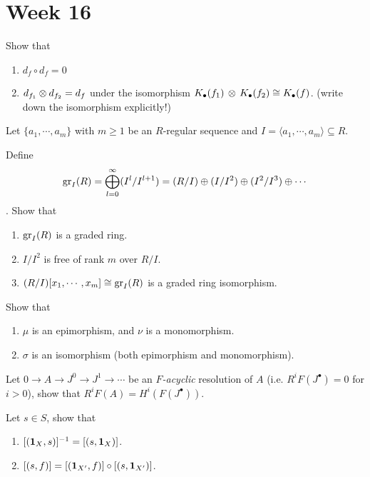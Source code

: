 
\section{Week 16}

\begin{exercise} Show that
  \begin{enumerate}
    \item $d_f \circ d_f = 0$
    \item $d_{f_1} \otimes d_{f_2} = d_f$ under the isomorphism 
      $K_\bullet (f_1) \, \otimes\, K_\bullet(f_2) \cong K_\bullet(f)$.
      (write down the isomorphism explicitly!)
  \end{enumerate}
\end{exercise}

\begin{exercise}
  Let $\{ a_1, \cdots, a_m \}$ with $m \ge 1$ be an $R$-regular sequence
  and $I = \langle a_1, \cdots, a_m \rangle \subseteq R$.

  Define 
  $$\operatorname{gr}_I(R) = \bigoplus\limits_{l=0}^\infty (I^l / I^{l+1}) = 
  (R / I) \oplus (I / I^2) \oplus (I^2 / I^3) \oplus \cdots$$.
  Show that
  \begin{enumerate}
    \item $\operatorname{gr}_I(R)$ is a graded ring.
    \item $I/I^2$ is free of rank $m$ over $R/I$.
    \item $(R/I)[x_1, \cdots, x_m] \cong \operatorname{gr}_I(R)$ is a graded ring isomorphism.
  \end{enumerate}
\end{exercise}

\begin{exercise}
  Show that 
  \begin{enumerate}
    \item $\mu$ is an epimorphism, and $\nu$ is a monomorphism.
    \item $\sigma$ is an isomorphism (both epimorphism and monomorphism).
  \end{enumerate}
\end{exercise}

\begin{exercise}
  Let $0 \to A \to J^0 \to J^1 \to \cdots$ be an {\it $F$-acyclic} resolution of $A$
  (i.e. $R^iF(J^\bullet) = 0$ for $i > 0$), show that $R^iF(A) = H^i(F(J^\bullet))$.
\end{exercise}

\begin{exercise}
  Let $s \in S$, show that
  \begin{enumerate}
    \item $[(\mathbf{1}_X, s)]^{-1} = [(s, \mathbf{1}_X)]$.
    \item $[(s, f)] = [(\mathbf{1}_{X'}, f)] \circ [(s, \mathbf{1}_{X'})]$.
  \end{enumerate}
\end{exercise}
